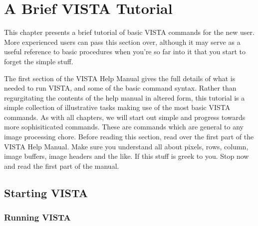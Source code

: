 %
%
%
%
%
%

%
%
%
\def \exfile#1{{\tenit #1\/}}

%

\chapter{A Brief VISTA Tutorial}

This chapter presents a brief tutorial of basic VISTA commands for the new
user.  More experienced users can pass this section over, although it may
serve as a useful reference to basic procedures when you're so far into it
that you start to forget the simple stuff.

The first section of the VISTA Help Manual gives the full details of what is
needed to run VISTA, and some of the basic command syntax.  Rather than
regurgitating the contents of the help manual in altered form, this tutorial
is a simple collection of illustrative tasks making use of the most basic
VISTA commands.  As with all chapters, we will start out simple and progress
towards more sophisiticated commands.  These are commands which are general to
any image processing chore.  Before reading this section, read over the first
part of the VISTA Help Manual.  Make sure you understand all about pixels,
rows, column, image buffers, image headers and the like.  If this stuff is
greek to you.  Stop now and read the first part of the manual.

\section{Starting VISTA}

\subsection{Running VISTA}

